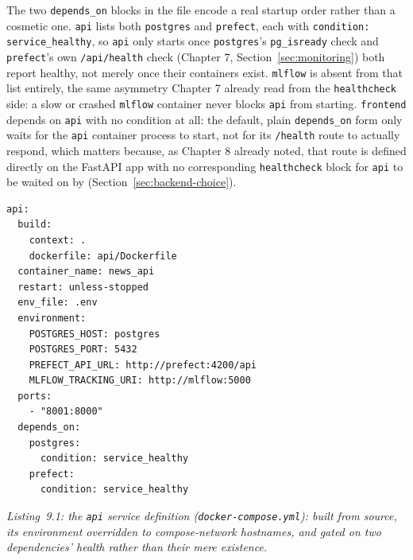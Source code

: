 \begin{sloppypar}
The two \texttt{depends\_on} blocks in the file encode a real startup order rather than a cosmetic one. \texttt{api} lists both \texttt{postgres} and \texttt{prefect}, each with \texttt{condition: service\_healthy}, so \texttt{api} only starts once \texttt{postgres}'s \texttt{pg\_isready} check and \texttt{prefect}'s own \texttt{/api/\allowbreak health} check (Chapter 7, Section~\ref{sec:monitoring}) both report healthy, not merely once their containers exist. \texttt{mlflow} is absent from that list entirely, the same asymmetry Chapter 7 already read from the \texttt{healthcheck} side: a slow or crashed \texttt{mlflow} container never blocks \texttt{api} from starting. \texttt{frontend} depends on \texttt{api} with no condition at all: the default, plain \texttt{depends\_on} form only waits for the \texttt{api} container process to start, not for its \texttt{/health} route to actually respond, which matters because, as Chapter 8 already noted, that route is defined directly on the FastAPI app with no corresponding \texttt{healthcheck} block for \texttt{api} to be waited on by (Section~\ref{sec:backend-choice}).
\end{sloppypar}

\begin{verbatim}
api:
  build:
    context: .
    dockerfile: api/Dockerfile
  container_name: news_api
  restart: unless-stopped
  env_file: .env
  environment:
    POSTGRES_HOST: postgres
    POSTGRES_PORT: 5432
    PREFECT_API_URL: http://prefect:4200/api
    MLFLOW_TRACKING_URI: http://mlflow:5000
  ports:
    - "8001:8000"
  depends_on:
    postgres:
      condition: service_healthy
    prefect:
      condition: service_healthy
\end{verbatim}
\begin{center}
\textit{Listing~9.1: the \texttt{api} service definition (\texttt{docker-compose.yml}): built from source, its environment overridden to compose-network hostnames, and gated on two dependencies' health rather than their mere existence.}
\end{center}

